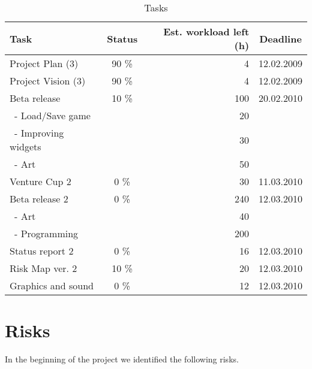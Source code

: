 \documentclass[12pt,a4paper]{article}
\begin{document}
\begin{table}[h!]
\small
\begin{tabular}{ l | c | r | c}
Task				&Status		&Est. workload left (h)	&Deadline \\\hline\hline
Project Plan (3) 	&90	\%		&4					&12.02.2009\\
Project Vision (3)	&90 	\%		&4					&12.02.2009\\
Beta release		&10 \%		&100				&20.02.2010\\
\ - Load/Save game	&			&20					&\\
\ - Improving widgets	&			&30					&\\
\ - Art				&			&50					&\\
Venture Cup 2		&0 \%		&30					&11.03.2010\\
Beta release 2		&0 \%		&240				&12.03.2010\\
\ - Art				&			&40					&\\
\ - Programming	&			&200				&\\
Status report 2		&0 \%		&16					&12.03.2010\\
Risk Map ver. 2		&10 \%		&20					&12.03.2010\\
Graphics and sound	&0 \%		&12					&12.03.2010
\end{tabular}
\caption{Tasks}
\label{tab:tasks}
\end{table}

\section{Risks}

In the beginning of the project we identified the following risks.
\end{document}
